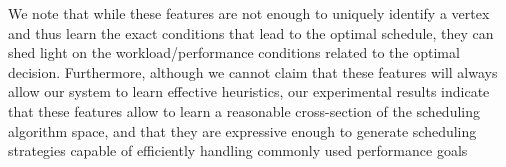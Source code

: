 We note that while these features are not enough to uniquely identify a vertex and thus learn the exact conditions that lead to the optimal schedule, they can shed light on the workload/performance conditions related to the optimal decision. Furthermore, although we cannot claim that these features will always allow our system to learn effective heuristics, our experimental results indicate that these features allow to learn a reasonable cross-section
of the scheduling algorithm space, and that they are expressive enough to generate scheduling strategies capable of efficiently handling commonly used performance goals
